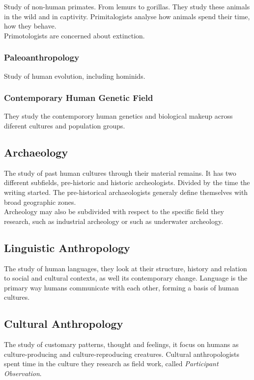 \documentclass[11pt,a4paper]{book}
\begin{document}
Study of non-human primates. From lemurs to gorillas. They study these animals in the wild and in captivity. Primitalogists analyse how animals spend their time, how they behave.\\

Primotologists are concerned about extinction.

\subsubsection{Paleoanthropology}

Study of human evolution, including hominids.

\subsubsection{Contemporary Human Genetic Field}

They study the contemporory human genetics and biological makeup across diferent cultures and population groups.

\subsection{Archaeology}

The study of past human cultures through their material remains. It has two different subfields, pre-historic and historic archeologists. Divided by the time the writing started. The pre-historical archaeologists generaly define themselves with broad geographic zones.\\

Archeology may also be subdivided with respect to the specific field they research, such as industrial archeology or such as underwater archeology.

\subsection{Linguistic Anthropology}

The study of human languages, they look at their structure, history and relation to social and cultural contexts, as well its contemporary change. Language is the primary way humans communicate with each other, forming a basis of human cultures.

\subsection{Cultural Anthropology}

The study of customary patterns, thought and feelings, it focus on humans as culture-producing and culture-reproducing creatures. Cultural anthropologists spent time in the culture they research as field work, called \textit{Participant Observation}\unsure.
\end{document}
